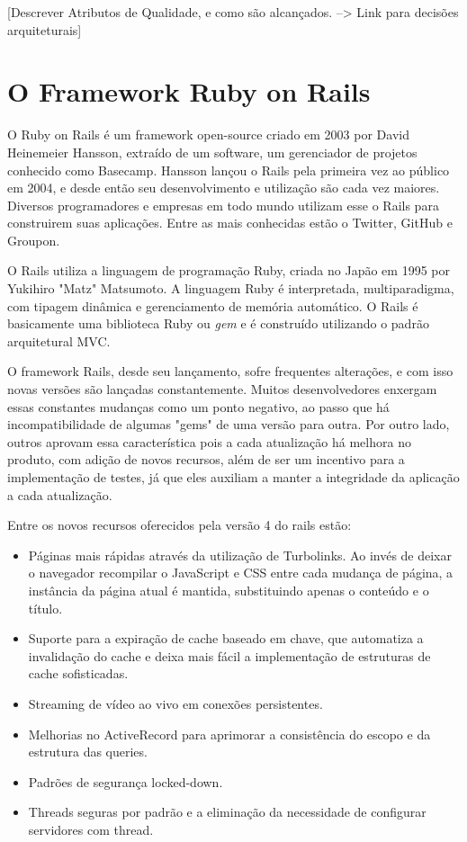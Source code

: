 [Descrever Atributos de Qualidade, e como são alcançados. --> Link para decisões arquiteturais]


\section{O Framework Ruby on Rails}

O Ruby on Rails é um framework open-source criado em 2003 por David Heinemeier Hansson, extraído de um software, um gerenciador de projetos conhecido como Basecamp.
Hansson lançou o Rails pela primeira vez ao público em 2004, e desde então seu desenvolvimento e utilização são cada vez maiores. Diversos programadores e empresas em todo mundo utilizam esse o Rails para construirem suas aplicações. Entre as mais conhecidas estão o Twitter, GitHub e Groupon. 

O Rails utiliza a linguagem de programação Ruby, criada no Japão em 1995 por Yukihiro "Matz" Matsumoto. A linguagem Ruby é interpretada, multiparadigma, com tipagem dinâmica e gerenciamento de memória automático. O Rails é basicamente uma biblioteca Ruby ou \textit{gem} e é construído utilizando o padrão arquitetural MVC.

O framework Rails, desde seu lançamento, sofre frequentes alterações, e com isso novas versões são lançadas constantemente. Muitos desenvolvedores enxergam essas constantes mudanças como um ponto negativo, ao passo que há incompatibilidade de algumas "gems" de uma versão para outra. Por outro lado, outros aprovam essa característica pois a cada atualização há melhora no produto, com adição de novos recursos, além de ser um incentivo para a implementação de testes, já que eles auxiliam a manter a integridade da aplicação a cada atualização.

Entre os novos recursos oferecidos pela versão 4 do rails estão:
\begin{itemize}
\item Páginas mais rápidas através da utilização de Turbolinks. Ao invés de deixar o navegador recompilar o JavaScript e CSS entre cada mudança de página, a instância da página atual é mantida, substituindo apenas o conteúdo e o título.
\item Suporte para a expiração de cache baseado em chave, que automatiza a invalidação do cache e deixa mais fácil a implementação de estruturas de cache sofisticadas.
\item Streaming de vídeo ao vivo em conexões persistentes.
\item Melhorias no ActiveRecord para aprimorar a consistência do escopo e da estrutura das queries.
\item Padrões de segurança locked-down.
\item Threads seguras por padrão e a eliminação da necessidade de configurar servidores com thread.
\end{itemize}



